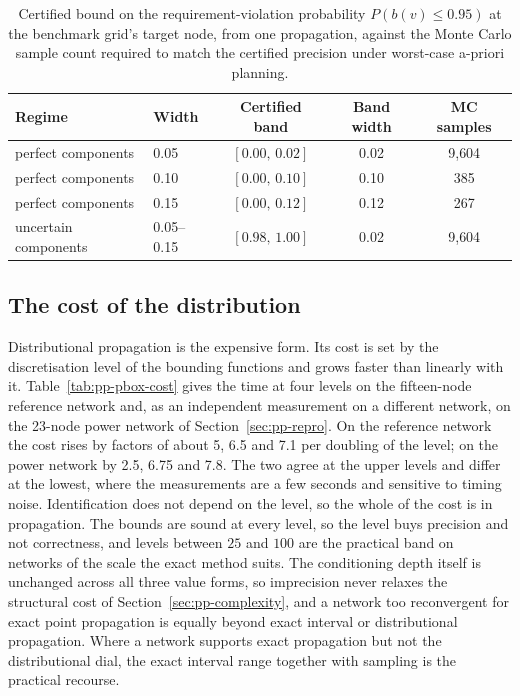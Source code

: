 \documentclass[12pt]{report}
\begin{document}
\begin{table}[htbp]
\centering
\caption{Certified bound on the requirement-violation probability $P(b(v) \le 0.95)$ at the benchmark grid's target node, from one propagation, against the Monte Carlo sample count required to match the certified precision under worst-case a-priori planning.}
\label{tab:pp-certified}
\footnotesize
\renewcommand{\arraystretch}{1.2}
\begin{tabular}{@{}llccc@{}}
\toprule
Regime & Width & Certified band & Band width & MC samples \\
\midrule
perfect components & 0.05 & $[0.00,\, 0.02]$ & 0.02 & 9{,}604 \\
perfect components & 0.10 & $[0.00,\, 0.10]$ & 0.10 & 385 \\
perfect components & 0.15 & $[0.00,\, 0.12]$ & 0.12 & 267 \\
uncertain components & 0.05--0.15 & $[0.98,\, 1.00]$ & 0.02 & 9{,}604 \\
\bottomrule
\end{tabular}
\end{table}

\subsection{The cost of the distribution}
\label{sec:pp-pbox-cost}

Distributional propagation is the expensive form. Its cost is set by the discretisation level of the bounding functions and grows faster than linearly with it. Table~\ref{tab:pp-pbox-cost} gives the time at four levels on the fifteen-node reference network and, as an independent measurement on a different network, on the 23-node power network of Section~\ref{sec:pp-repro}. On the reference network the cost rises by factors of about 5, 6.5 and 7.1 per doubling of the level; on the power network by 2.5, 6.75 and 7.8. The two agree at the upper levels and differ at the lowest, where the measurements are a few seconds and sensitive to timing noise. Identification does not depend on the level, so the whole of the cost is in propagation. The bounds are sound at every level, so the level buys precision and not correctness, and levels between $25$ and $100$ are the practical band on networks of the scale the exact method suits. The conditioning depth itself is unchanged across all three value forms, so imprecision never relaxes the structural cost of Section~\ref{sec:pp-complexity}, and a network too reconvergent for exact point propagation is equally beyond exact interval or distributional propagation. Where a network supports exact propagation but not the distributional dial, the exact interval range together with sampling is the practical recourse.
\end{document}

